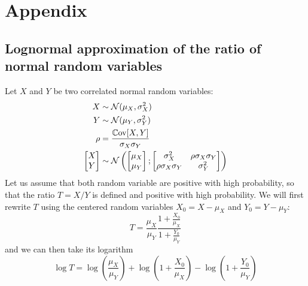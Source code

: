 \documentclass[../../Main_ManuscritThese.tex]{subfiles}
\begin{document}
%	


\begingroup

\appendix
\setcounter{chapter}{5}
\renewcommand{\thechapter}{A}
\TitleBtwLines
\chapter{Appendix}


\label{chap:appendix}
\pagestyle{appendixStyle}
\minitoc

  \section{Lognormal approximation of the ratio of normal random variables}
  \label{sec:lognorm_ratio}
  Let $X$ and $Y$ be two correlated normal random variables:
  \begin{align}
    X &\sim \mathcal{N}(\mu_X, \sigma^2_X) \\
    Y &\sim \mathcal{N}(\mu_Y, \sigma^2_Y) \\
    \rho &= \frac{\Cov[X,Y]}{\sigma_X \sigma_Y} \\
    \begin{bmatrix}
      X \\ Y
    \end{bmatrix} &\sim \mathcal{N}\left(%
    \begin{bmatrix}
      \mu_X \\ \mu_Y
    \end{bmatrix};%
    \begin{bmatrix}
      \sigma^2_X  & \rho \sigma_X \sigma_Y \\
      \rho\sigma_X \sigma_Y & \sigma^2_Y
    \end{bmatrix} \right)
  \end{align}
  Let us assume that both random variable are positive with high
  probability, so that the ratio $T=X/Y$ is defined and positive with
  high probability.  We will first rewrite $T$ using the centered
  random variables $X_0=X-\mu_X$ and $Y_0 = Y-\mu_Y$:
  \begin{equation}
    T = \frac{\mu_X}{\mu_Y}\frac{1 + \frac{X_0}{\mu_X}}{1 + \frac{Y_0}{\mu_Y}}
  \end{equation}
  and we can then take its logarithm
  \begin{equation}
    \log T = \log\left(\frac{\mu_X}{\mu_Y}\right) + \log\left(1 + \frac{X_0}{\mu_X}\right) -\log\left(1 + \frac{Y_0}{\mu_Y}\right)
  \end{equation}
  
\end{document}
